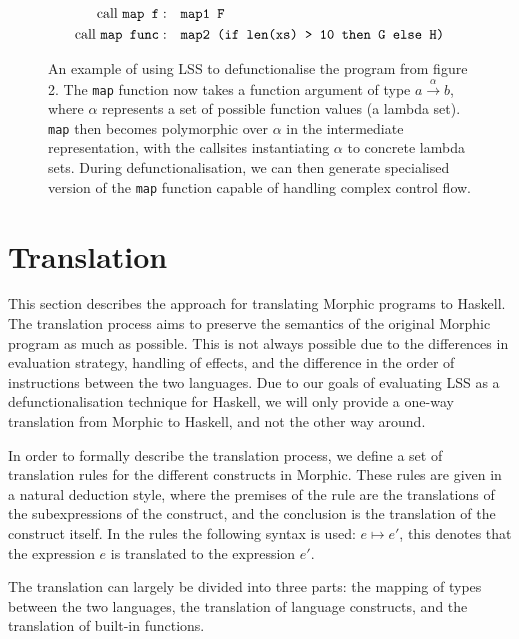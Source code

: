 \documentclass[a4paper,UKenglish,cleveref, autoref, thm-restate]{template/lipics-v2021}
\newcommand{\lss}{LSS\xspace}
\begin{document}
\begin{figure}[ht]
\begin{align*}
    \text{call \texttt{map f}}:\quad        & \texttt{map1 F}                                                                                                                             \\
    \text{call \texttt{map func}}:\quad     & \texttt{map2 (if len(xs) > 10 then G else H)}
  \end{align*}
  \caption{An example of using LSS to defunctionalise the program from figure 2. The \texttt{map} function now takes a function argument of type $a \stackrel{\alpha}{\to} b$, where $\alpha$ represents a set of possible function values (a lambda set). \texttt{map} then becomes polymorphic over $\alpha$ in the intermediate representation, with the callsites instantiating $\alpha$ to concrete lambda sets. During defunctionalisation, we can then generate specialised version of the \texttt{map} function capable of handling complex control flow.}
  \label{fig:ex-lss}
\end{figure}


\section{Translation}\label{sec:trans}
This section describes the approach for translating Morphic programs to Haskell. The translation process aims to preserve the semantics of the original Morphic program as much as possible. This is not always possible due to the differences in evaluation strategy, handling of effects, and the difference in the order of instructions between the two languages. Due to our goals of evaluating \lss as a defunctionalisation technique for Haskell, we will only provide a one-way translation from Morphic to Haskell, and not the other way around.

In order to formally describe the translation process, we define a set of translation rules for the different constructs in Morphic. These rules are given in a natural deduction style, where the premises of the rule are the translations of the subexpressions of the construct, and the conclusion is the translation of the construct itself. In the rules the following syntax is used: $e \mapsto e'$, this denotes that the expression $e$ is translated to the expression $e'$.

The translation can largely be divided into three parts: the mapping of types between the two languages, the translation of language constructs, and the translation of built-in functions.
\end{document}
